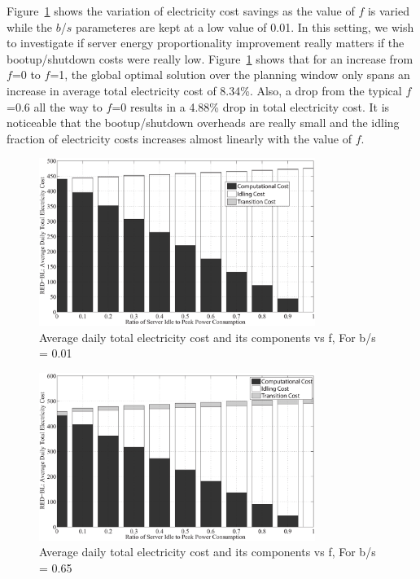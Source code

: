Figure~\ref{fig:fvar1} shows the variation of electricity cost savings as the value of $f$ is varied while the $b$/$s$ parameteres are kept at a low value of 0.01. In this setting, we wish to investigate if server energy proportionality improvement really matters if the bootup/shutdown costs were really low. Figure~\ref{fig:fvar1} shows that for an increase from $f$=0 to $f$=1, the global optimal solution over the planning window only spans an increase in average total electricity cost of 8.34\%. Also, a drop from the typical $f$=0.6 all the way to $f$=0 results in a 4.88\% drop in total electricity cost. It is noticeable that the bootup/shutdown overheads are really small and the idling fraction of electricity costs increases almost linearly with the value of $f$.
 
\begin{figure}
\includegraphics[width=0.8\textwidth]{pics/fvar-0.01bs.eps}
\caption{Average daily total electricity cost and its components vs f, For b\slash s = 0.01}
\label{fig:fvar1}
\end{figure}

\begin{figure}
\includegraphics[width=0.8\textwidth]{pics/fvar-0.65bs.eps}
\caption{Average daily total electricity cost and its components vs f, For b\slash s = 0.65}
\label{fig:fvar2}
\end{figure}

